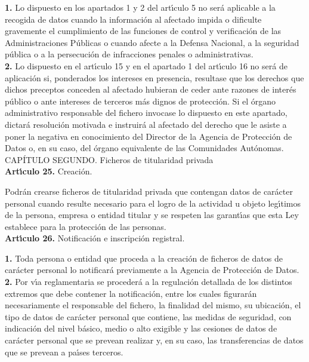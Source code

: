 {\bf 1.} Lo dispuesto en los apartados 1 y 2 del art\'{\i}culo 5 no ser\'a 
aplicable a la recogida de datos cuando la informaci\'on al afectado impida o 
dificulte gravemente el cumplimiento de las funciones de control y 
verificaci\'on de las Administraciones P\'ublicas o cuando afecte a la Defensa 
Nacional, a la seguridad p\'ublica o a la persecuci\'on de infracciones penales 
o administrativas.\\

{\bf 2.} Lo dispuesto en el art\'{\i}culo 15 y en el apartado 1 del 
art\'{\i}culo 16 no ser\'a de aplicaci\'on si, ponderados los intereses en 
presencia, resultase que los derechos que dichos preceptos conceden al afectado 
hubieran de ceder ante razones de inter\'es p\'ublico o ante intereses de 
terceros m\'as dignos de protecci\'on. Si el \'organo administrativo 
responsable del fichero invocase lo dispuesto en este apartado, dictar\'a 
resoluci\'on motivada e instruir\'a al afectado del derecho que le asiste a 
poner la negativa en conocimiento del Director de la Agencia de Protecci\'on de 
Datos o, en su caso, del \'organo equivalente de las Comunidades Aut\'onomas.
\vspace{0.3cm}\\
{\large CAP\'ITULO SEGUNDO. Ficheros de titularidad privada}
\vspace{0.3cm}\\
{\large {\bf Art\'{\i}culo 25.} Creaci\'on.}

Podr\'an crearse ficheros de titularidad privada que contengan datos de 
car\'acter personal cuando resulte necesario para el logro de la actividad u 
objeto leg\'{\i}timos de la persona, empresa o entidad titular y se respeten 
las garant\'{\i}as que esta Ley establece para la protecci\'on de las personas.
\vspace{0.3cm}\\
{\large {\bf Art\'{\i}culo 26.} Notificaci\'on e inscripci\'on registral.}

{\bf 1.} Toda persona o entidad que proceda a la creaci\'on de ficheros de 
datos de car\'acter personal lo notificar\'a previamente a la Agencia de 
Protecci\'on de Datos.\\

{\bf 2.} Por v\'{\i}a reglamentaria se proceder\'a a la regulaci\'on detallada 
de los distintos extremos que debe contener la notificaci\'on, entre los cuales 
figurar\'an necesariamente el responsable del fichero, la finalidad del mismo,
su ubicaci\'on, el tipo de datos de car\'acter personal que contiene, las 
medidas de seguridad, con indicaci\'on del nivel b\'asico, medio o alto 
exigible y las cesiones de datos de car\'acter personal que se prevean realizar 
y, en su caso, las transferencias de datos que se prevean a pa\'{\i}ses 
terceros.\\

